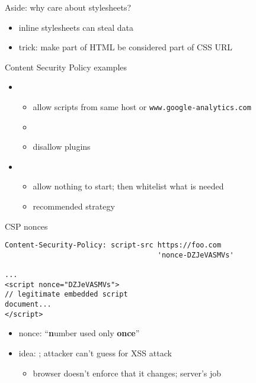 \begin{frame}{Aside: why care about stylesheets?}
    \begin{itemize}
    \item inline stylesheets can steal data
    \item trick: make part of HTML be considered part of CSS URL
    \end{itemize}
\end{frame}
\begin{frame}{Content Security Policy examples}
    \begin{itemize}
        \item {}
        \begin{itemize}
            \item allow scripts from same host or \texttt{www.google-analytics.com}
            \item {}
            \item disallow plugins
        \end{itemize}
    \item {}
        \begin{itemize}
            \item allow nothing to start; then whitelist what is needed
            \item recommended strategy
        \end{itemize}
    \end{itemize}
\end{frame}

\begin{frame}[fragile,label=CSPNonces]{CSP nonces}
\begin{verbatim}
Content-Security-Policy: script-src https://foo.com
                                    'nonce-DZJeVASMVs'

...
<script nonce="DZJeVASMVs">
// legitimate embedded script
document...
</script>
\end{verbatim}
    \begin{itemize}
    \item nonce: ``\textbf{n}umber used only \textbf{once}''
    \item idea: ; attacker can't guess for XSS attack
        \begin{itemize}
        \item browser doesn't enforce that it changes; server's job
        \end{itemize}
    \end{itemize}
\end{frame}
